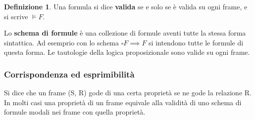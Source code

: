 \documentclass{article}
\theoremstyle{definition}
\newtheorem{definizione}{Definizione}
\theoremstyle{plain}
\theoremstyle{plain}
\theoremstyle{plain}
\theoremstyle{plain}
\begin{document}
\begin{definizione}
    Una formula si dice \textbf{valida} se e solo se è valida su ogni frame, e si scrive $\models F$.
\end{definizione}

Lo \textbf{schema di formule} è una collezione di formule aventi tutte la stessa forma sintattica. Ad esemprio con lo schema $\square F \implies F$ si intendono tutte le formule di questa forma.
Le tautologie della logica proposizionale sono valide su ogni frame.

\subsubsection*{Corrispondenza ed esprimibilità}
Si dice che un frame (S, R) gode di una certa proprietà se ne gode la relazione R. In molti casi una proprietà di un frame equivale alla validità di uno schema di formule modali nei frame con quella proprietà.
\end{document}
